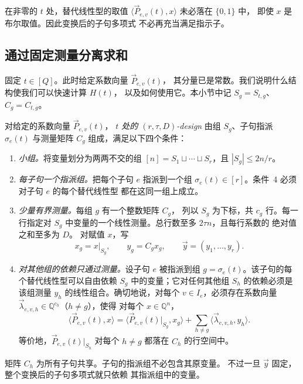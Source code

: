 在非零的 $t$ 处，替代线性型的取值
$\langle\vec{P}_{e,v}(t),x\rangle$ 未必落在 $\{0,1\}$ 中，
即使 $x$ 是布尔取值。因此变换后的子句多项式
不必再充当满足指示子。

\subsection{通过固定测量分离求和}
\label{subsec:preview-separation}
固定 $t\in[Q]$。此时给定系数向量 $\vec{P}_{e,v}(t)$，
其分量已是常数。我们说明什么结构使我们可以快速计算 $H(t)$，
以及如何使用它。本小节中记 $S_g=S_{t,g}$、$C_g=C_{t,g}$。

\begin{definition}
\label{def:overview-measurement-structure}
对给定的系数向量 $\vec{P}_{e,v}(t)$，
\emph{$t$ 处的 $(r,\tau,D)$-design}
由组 $S_g$、子句指派 $\sigma_e(t)$ 与测量矩阵 $C_g$
组成，满足以下四个条件：
\begin{enumerate}
\item \emph{小组。}将变量划分为两两不交的组
$[n]=S_1\sqcup\cdots\sqcup S_r$，且 $|S_g|\le2n/r$。
\item \emph{每子句一个指派组。}把每个子句 $e$ 指派到一个组
$\sigma_e(t)\in[r]$。条件~4 必须对子句 $e$ 的每个替代线性型
都在这同一组上成立。
\item \emph{少量有界测量。}每组 $g$ 有一个整数矩阵 $C_g$，
列以 $S_g$ 为下标，共 $c_g$ 行。每一行指定对 $S_g$
中变量的一个线性测量。总行数至多 $2\tau n$，且每行系数的
绝对值之和至多为 $D$。
对赋值 $x$，写
\[
 x_g=x|_{S_g},\qquad y_g=C_gx_g,\qquad
 \vec{y}=(y_1,\ldots,y_r).
\]
\item \emph{对其他组的依赖只通过测量。}设子句 $e$ 被指派到组
$g=\sigma_e(t)$。该子句的每个替代线性型可以自由依赖 $S_g$
中的变量；它对任何其他组 $S_h$ 的依赖必须是该组测量 $y_h$
的线性组合。确切地说，对每个 $v\in I_e$，必须存在系数向量
$\vec{\lambda}_{e,v,h}\in\mathbb Q^{c_h}$（$h\ne g$），使得
对每个 $x\in\mathbb Q^n$，
\begin{equation}\label{eq:outline-separation}
 \langle\vec{P}_{e,v}(t),x\rangle
 =\langle\vec{P}_{e,v}(t)|_{S_g},x_g\rangle
   +\sum_{h\ne g}\langle\vec{\lambda}_{e,v,h},y_h\rangle.
\end{equation}
等价地，$\vec{P}_{e,v}(t)|_{S_h}$ 对每个 $h\ne g$ 都落在 $C_h$
的行空间中。
\end{enumerate}
\end{definition}
矩阵 $C_h$ 为所有子句共享。子句的指派组不必包含其原变量。
不过一旦 $\vec{y}$ 固定，整个变换后的子句多项式就只依赖
其指派组中的变量。

